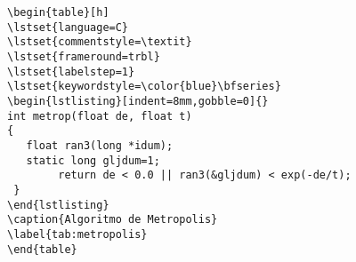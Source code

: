 \documentclass[letterpaper,12pt]{article}
\begin{document}
\pagestyle{empty}
\thispagestyle{empty}

\noindent
\begin{verbatim}
\begin{table}[h]
\lstset{language=C}
\lstset{commentstyle=\textit}
\lstset{frameround=trbl}
\lstset{labelstep=1}
\lstset{keywordstyle=\color{blue}\bfseries}
\begin{lstlisting}[indent=8mm,gobble=0]{}
int metrop(float de, float t)
{
   float ran3(long *idum);
   static long gljdum=1;
        return de < 0.0 || ran3(&gljdum) < exp(-de/t);
 }
\end{lstlisting}
\caption{Algoritmo de Metropolis}
\label{tab:metropolis}
\end{table}
\end{verbatim}
\end{document}
